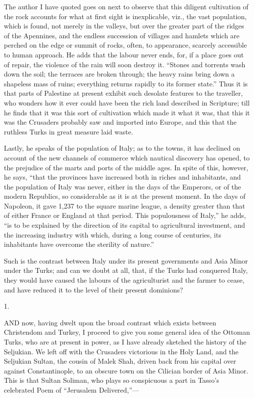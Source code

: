 The author I have quoted goes
on next to observe that this diligent cultivation of the rock accounts
for what at first sight is inexplicable, viz., the vast
population, which is found, not merely in the valleys, but over the
greater part of the ridges of the Apennines, and the endless
succession of villages and hamlets which are perched on the edge or
summit of rocks, often, to appearance, scarcely accessible to human
approach. He adds that the labour never ends, for, if a place goes out
of repair, the violence of the rain will soon destroy it. ``Stones and
torrents wash down the soil; the terraces are broken through; the
heavy rains bring down a shapeless mass of ruins; everything returns
rapidly to its former state.'' Thus it is that parts of Palestine at
present exhibit such desolate features to the traveller, who wonders
how it ever could have been the rich land described in Scripture; till
he finds that it was this sort of cultivation which made it what it
was, that this it was the Crusaders probably saw and imported into
Europe, and this that the ruthless Turks in great measure laid waste.

Lastly, he speaks of the
population of Italy; as to the towns, it has declined on account of
the new channels of commerce which nautical discovery has opened, to
the prejudice of the marts and ports of the middle ages. In spite of
this, however, he says, ``that the provinces have increased both in
riches and inhabitants, and the population of Italy was never, either
in the days of the Emperors, or of the modern Republics, so
considerable as it is at the present moment. In the days of Napoleon,
it gave 1,237 to the square marine league, a density greater than that
of either France or England at that period. This populousness of
Italy,'' he adds, ``is to be explained by the direction of its capital
to agricultural investment, and the increasing industry with which,
during a long course of centuries, its inhabitants have overcome the
sterility of nature.''

Such is the contrast between
Italy under its present governments and Asia Minor under the Turks;
and can we doubt at all, that, if the Turks had conquered Italy, they
would have caused the labours of the agriculturist and the farmer to
cease, and have reduced it to the level of their present dominions?


1.

AND
now, having dwelt upon the broad contrast which exists between
Christendom and Turkey, I proceed to give you some general idea of the
Ottoman Turks, who are at present in power, as I have already sketched
the history of the Seljukian. We left off with the Crusaders
victorious in the Holy Land, and the Seljukian Sultan, the cousin of
Malek Shah, driven back from his capital over against Constantinople,
to an obscure town on the Cilician border of Asia Minor. This is that
Sultan Soliman, who plays so conspicuous a part in Tasso's celebrated
Poem of ``Jerusalem Delivered,''—

